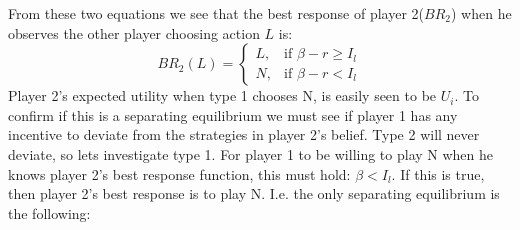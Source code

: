 From these two equations we see that the best response of player 2($BR_2$) when he observes the other player choosing action $L$ is:
\begin{equation}
BR_{2}(L)=
\begin{cases}
L, & \text{if }\beta - r \geq I_{l}\\
N, & \text{if } \beta -r<I_{l}
\end{cases}
\label{eq:insuredBR}
\end{equation}
Player 2's expected utility when type 1 chooses N, is easily seen to be $U_{i}$. 
To confirm if this is a separating equilibrium we must see if player 1 has any incentive to deviate from the strategies in player 2's belief.
Type 2 will never deviate, so lets investigate type 1.
For player 1 to be willing to play N when he knows player 2's best response function, this must hold: $\beta<I_{l}$. If this is true, then player 2's best response is to play N. I.e. the only separating equilibrium is the following:


